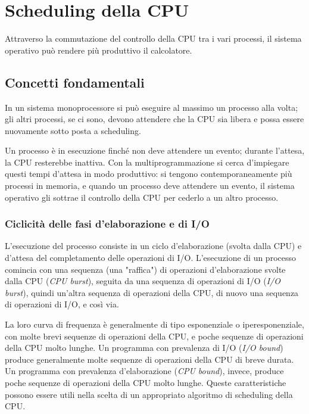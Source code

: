 \documentclass[11pt,a4paper]{article}
\begin{document}
\section{Scheduling della CPU}
Attraverso la
commutazione del controllo della CPU tra i vari processi, il sistema operativo può rendere
più produttivo il calcolatore.

\subsection{Concetti fondamentali}
In un sistema monoprocessore si può eseguire al massimo un processo alla volta; gli altri
processi, se ci sono, devono attendere che la CPU sia libera e possa essere nuovamente sotto­
posta a scheduling.

Un processo è in esecu­zione finché non deve attendere un evento; durante l'attesa,
la CPU resterebbe inattiva. Con la multiprogrammazione si cerca d'impiega­re questi tempi d'attesa in modo produttivo: si tengono contemporaneamente più processi
in memoria, e quando un processo deve attendere un evento, il sistema operativo gli sottrae
il controllo della CPU per cederlo a un altro processo.

\subsubsection{Ciclicità delle fasi d'elaborazione e di I/O}
L'esecuzione del processo consiste in un ciclo d'elaborazione (svolta dalla CPU) e
d'attesa del completamento delle operazioni di I/O. L'esecuzione di un processo comincia con una sequenza (una "raffica") di operazioni
d'elaborazione svolte dalla CPU (\emph{CPU burst}), seguita da una sequenza di operazioni di I/O
(\emph{I/O burst}),  quindi un'altra sequenza di operazioni della CPU, di nuovo una sequenza di ope­razioni di I/O, e così via.

La loro curva di frequenza è generalmente di tipo esponenziale o iperesponenziale, con molte brevi sequenze di operazioni della CPU, e poche sequenze di operazioni della
CPU molto lunghe. Un programma con prevalenza di I/O (\emph{I/O bound}) produce generalmen­te molte sequenze di operazioni della CPU di breve durata. Un programma con prevalenza
d'elaborazione (\emph{CPU bound}),  invece, produce poche sequenze di operazioni della CPU molto
lunghe. Queste caratteristiche possono essere utili nella scelta di un appropriato algoritmo
di scheduling della CPU.
\end{document}
